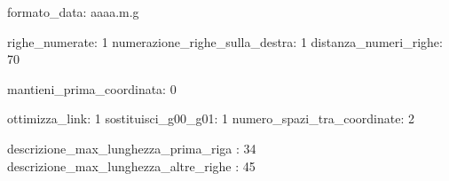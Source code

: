 formato_data: aaaa.m.g

righe_numerate:                 1
numerazione_righe_sulla_destra: 1
distanza_numeri_righe:          70

mantieni_prima_coordinata:      0

ottimizza_link:              1
sostituisci_g00_g01:         1
numero_spazi_tra_coordinate: 2

descrizione_max_lunghezza_prima_riga  : 34
descrizione_max_lunghezza_altre_righe : 45
